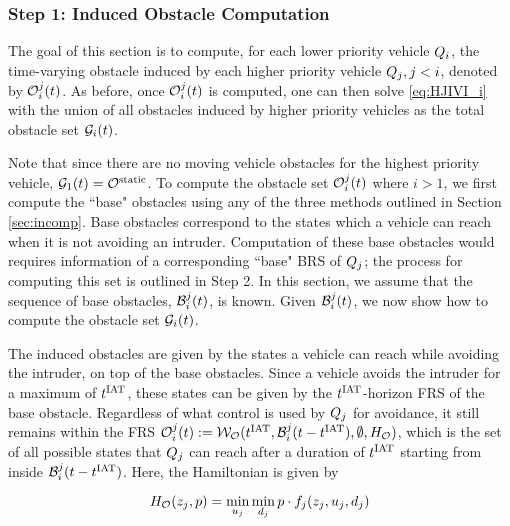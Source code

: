 \subsubsection{Step 1: Induced Obstacle Computation \label{sec:intruder_iocomp}}
The goal of this section is to compute, for each lower priority vehicle $Q_{i}$, the time-varying obstacle induced by each higher priority vehicle $Q_{j}, j < i$, denoted by $\mathcal{O}_i^j(t)$. As before, once $\mathcal{O}_i^j(t)$ is computed, one can then solve \eqref{eq:HJIVI_i} with the union of all obstacles induced by higher priority vehicles as the total obstacle set $\mathcal{G}_i(t)$. 

Note that since there are no moving vehicle obstacles for the highest priority vehicle, $\mathcal{G}_1(t) = \mathcal{O}^\text{static}$. To compute the obstacle set $\mathcal{O}_i^j(t)$ where $i> 1$, we first compute the ``base" obstacles using any of the three methods outlined in Section \ref{sec:incomp}. Base obstacles correspond to the states which a vehicle can reach when it is not avoiding an intruder. Computation of these base obstacles would requires information of a corresponding ``base" BRS of $Q_{j}$; the process for computing this set is outlined in Step 2. In this section, we assume that the sequence of base obstacles, $\mathcal{B}_i^j(t)$, is known. Given $\mathcal{B}_i^j(t)$, we now show how to compute the obstacle set $\mathcal{G}_i(t)$. 

The induced obstacles are given by the states a vehicle can reach while avoiding the intruder, on top of the base obstacles. Since a vehicle avoids the intruder for a maximum of $t^\text{IAT}$, these states can be given by the $t^\text{IAT}$-horizon FRS of the base obstacle. Regardless of what control is used by $Q_{j}$ for avoidance, it still remains within the FRS $\mathcal{O}_i^j(t) := \mathcal{W}_{\mathcal{O}}(t^\text{IAT}, \mathcal{B}_i^j(t-t^\text{IAT}), \emptyset, H_{\mathcal{O}})$, which is the set of all possible states that $Q_{j}$ can reach after a duration of $t^\text{IAT}$ starting from inside $\mathcal{B}_i^j(t-t^\text{IAT})$. Here, the Hamiltonian is given by

\begin{equation}
H_{\mathcal{O}}(z_j, p) = \min_{u_j} \min_{d_j} p \cdot f_j (z_j, u_j, d_j)
\end{equation}
